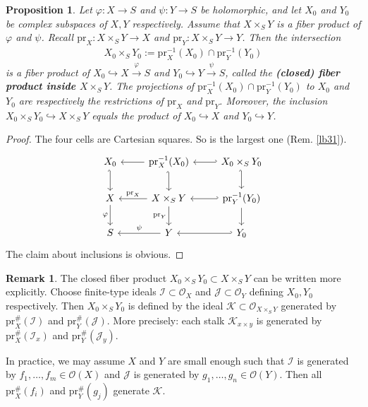 \documentclass[12pt,b5paper,notitlepage]{report}
\theoremstyle{definition}
\newtheorem{rem}[df]{Remark}
\theoremstyle{plain}
\newtheorem{pp}[df]{Proposition}
\newcommand{\mc}{\mathcal}
\newcommand{\scr}{\mathscr}
\newcommand{\pr}{\mathrm {pr}}
\numberwithin{equation}{section}
\begin{document}
\begin{pp}\label{lb32}
Let $\varphi:X\rightarrow S$ and $\psi:Y\rightarrow S$ be holomorphic, and let $X_0$ and $Y_0$ be complex subspaces of $X,Y$ respectively. Assume that $X\times_SY$ is a fiber product of $\varphi$ and $\psi$. Recall $\pr_X:X\times_SY\rightarrow X$ and $\pr_Y:X\times_SY\rightarrow Y$. Then the intersection
\begin{align*}
X_0\times_S Y_0:=\pr_X^{-1}(X_0)\cap \pr_Y^{-1}(Y_0)
\end{align*}
is a fiber product of $X_0\hookrightarrow X\xrightarrow{\varphi}S$ and $Y_0\hookrightarrow Y\xrightarrow{\psi}S$, called the \textbf{(closed) fiber product inside $X\times_SY$}.  The projections of $\pr_X^{-1}(X_0)\cap\pr_Y^{-1}(Y_0)$ to $X_0$ and $Y_0$ are respectively the restrictions of $\pr_X$ and $\pr_Y$. Moreover, the inclusion $X_0\times_S Y_0\hookrightarrow X\times_SY$ equals the product of $X_0\hookrightarrow X$ and $Y_0\hookrightarrow Y$.
\end{pp}


\begin{proof}
The four cells are Cartesian squares. So is the largest one (Rem. \ref{lb31}).
\begin{equation}
\begin{tikzcd}
X_0 \arrow[d, hook']    & \pr_X^{-1}(X_0) \arrow[l] \arrow[d, hook']   & X_0\times_S Y_0 \arrow[l, hook'] \arrow[d, hook'] \\
X \arrow[d, "\varphi"'] & X\times_SY \arrow[l,"\pr_X"'] \arrow[d,"\pr_Y"'] & \pr_Y^{-1}(Y_0) \arrow[l, hook'] \arrow[d]        \\
S                       & Y \arrow[l, "\psi"']           & Y_0 \arrow[l, hook']               
\end{tikzcd}
\end{equation}
The claim about inclusions is obvious.
\end{proof}


\begin{rem}\label{lb35}
The closed fiber product $X_0\times_SY_0\subset X\times_SY$ can be written more explicitly. Choose finite-type ideals $\mc I\subset\scr O_X$ and $\mc J\subset\scr O_Y$ defining $X_0,Y_0$ respectively. Then $X_0\times_SY_0$ is defined by the ideal $\mc K\subset \scr O_{X\times_SY}$ generated by $\pr_X^\#(\mc I)$ and $\pr_Y^\#(\mc J)$. More precisely: each stalk $\mc K_{x\times y}$ is generated by $\pr_X^\#(\mc I_x)$ and $\pr_Y^\#(\mc J_y)$.

In practice, we may assume $X$ and $Y$ are small enough such that $\mc I$ is generated by $f_1,\dots,f_m\in\scr O(X)$ and $\mc J$ is generated by $g_1,\dots,g_n\in\scr O(Y)$. Then all $\pr_X^\#(f_i)$ and $\pr_Y^\#(g_j)$ generate $\mc K$.  \hfill\qedsymbol
\end{rem}
\end{document}
